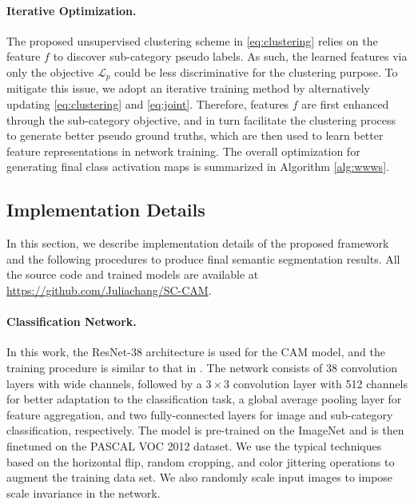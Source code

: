 \documentclass[10pt,twocolumn,letterpaper]{article}
\begin{document}
\paragraph{Iterative Optimization.}
The proposed unsupervised clustering scheme in \eqref{eq:clustering} relies on the feature $f$ to discover sub-category pseudo labels. 
As such, the learned features via only the objective $\mathcal{L}_p$ could be less discriminative for the clustering purpose.
To mitigate this issue, we adopt an iterative training method by alternatively updating \eqref{eq:clustering} and \eqref{eq:joint}.
Therefore, features $f$ are first enhanced through the sub-category objective, and in turn facilitate the clustering process to generate better pseudo ground truths, which are then used to learn better feature representations in network training.
The overall optimization for generating final class activation maps is summarized in Algorithm \ref{alg:wwws}.
















\subsection{Implementation Details}
In this section, we describe implementation details of the proposed framework and the following procedures to produce final semantic segmentation results. 
All the source code and trained models are available at \url{https://github.com/Juliachang/SC-CAM}.




\paragraph{Classification Network.}
In this work, the ResNet-38 architecture \cite{wu2019wider} is used for the CAM model, and the training procedure is similar to that in \cite{ahn2018learning}.  
The network consists of 38 convolution layers with wide channels, followed by a $3 \times 3$ convolution layer with 512 channels for better adaptation to the classification task, a global average pooling layer for feature aggregation, and two fully-connected layers for image and sub-category classification, respectively.
The model is pre-trained on the ImageNet \cite{deng2009imagenet} and is then finetuned on the PASCAL VOC 2012 dataset.
We use the typical techniques based on the horizontal flip, random cropping, and color jittering operations to augment the training data set. 
We also randomly scale input images to impose scale invariance in the network.
\end{document}
